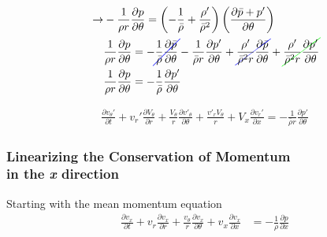 \begin{align*}
\text{} \rightarrow&
-\frac{1}{\rho r}\frac{\partial p}{\partial \theta} = \left( -\frac{1    }{\bar{\rho}} +
\frac{\rho'}{\bar{\rho}^2}\right) \left(\frac{\partial \bar{p} + p'}{\partial \theta}\right)\\
&\frac{1}{\rho r}\frac{\partial p}{\partial \theta} =  -\Ccancel[blue]{\frac{1    }{\bar{\rho}}  \frac{\partial \bar{p}}{\partial \theta}} -  
\frac{1    }{\bar{\rho} r}  \frac{\partial p'}{\partial \theta} +
\Ccancel[blue]{\frac{\rho'}{\bar{\rho}^2 r}\frac{\partial \bar{p}}{\partial \theta}} +
\Ccancel[green]{\frac{\rho'}{\bar{\rho}^2 r}\frac{\partial p'}{\partial \theta}}\\
&\frac{1}{\rho r}\frac{\partial p}{\partial \theta} =  -\frac{1    }{\bar{\rho}}  \frac{\partial p'}{\partial \theta} 
\end{align*}

\begin{align*}
\boxed{
	\frac{\partial  v_{\theta}' }{\partial t} +
	v_r' \frac{\partial  V_{\theta}  }{\partial r} +
	\frac{V_{\theta}}{r} \frac{\partial v'_{\theta}}{\partial \theta} +
	\frac{v'_rV_{\theta}}{r} +
	V_x \frac{\partial v_r'}{\partial x} 
	= -\frac{1}{\bar{\rho} r}	\frac{\partial p'}{\partial \theta}
}
\end{align*}
\newpage
\subsubsection{Linearizing the Conservation of Momentum\\ in the \textit{x} direction}
Starting with the mean momentum equation 
\begin{align*}
\frac{\partial v_{x}}{\partial t} + 
v_r 
\frac{\partial v_x}{\partial r} +
\frac{v_{\theta}}{r}
\frac{\partial v_x}{\partial \theta}+ 
v_x \frac{\partial v_x}{\partial x} 
&= 
-\frac{1}{\rho } 
\frac{\partial p}{\partial x}
\end{align*}

